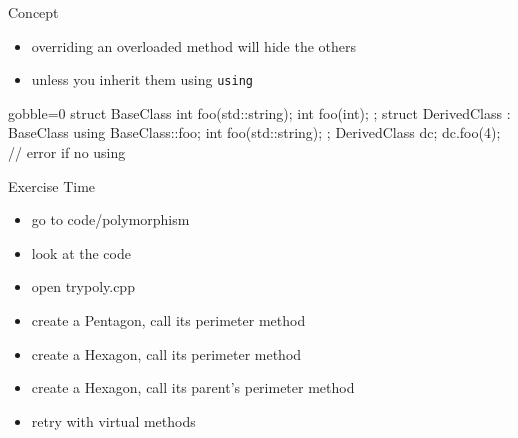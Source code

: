 \begin{frame}[fragile]
  \begin{block}{Concept}
    \begin{itemize}
    \item overriding an overloaded method will hide the others
    \item unless you inherit them using \texttt{using}
    \end{itemize}
  \end{block}
  \begin{cppcode*}{gobble=0}
    struct BaseClass {
      int foo(std::string);
      int foo(int);
    };
    struct DerivedClass : BaseClass {
      using BaseClass::foo;
      int foo(std::string);
    };
    DerivedClass dc;
    dc.foo(4);      // error if no using
    \end{cppcode*}
\end{frame}

\begin{frame}[fragile]
  \begin{alertblock}{Exercise Time}
    \begin{itemize}
    \item go to code/polymorphism
    \item look at the code
    \item open trypoly.cpp
    \item create a Pentagon, call its perimeter method
    \item create a Hexagon, call its perimeter method
    \item create a Hexagon, call its parent's perimeter method
    \item retry with virtual methods
    \end{itemize}
  \end{alertblock}
\end{frame}

